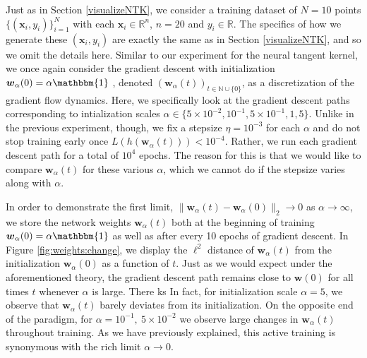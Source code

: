 \documentclass{article}
\begin{document}
Just as in Section \ref{visualizeNTK}, we consider a training dataset of $N = 10$ points $\{(\boldsymbol{x}_i, y_i) \}_{i=1}^N$ with each $\boldsymbol{x}_i \in \mathbb{R}^n$, $n=20$ and $y_i \in \mathbb{R}$. The specifics of how we generate these $(\boldsymbol{x}_i, y_i)$ are exactly the same as in Section \ref{visualizeNTK}, and so we omit the details here. Similar to our experiment for the neural tangent kernel, we once again consider the gradient descent with initialization $\boldsymbol{w}_{\alpha}(0) = \alpha \mathbbm{1}$ , denoted $(\boldsymbol{w}_{\alpha}(t))_{t \in \mathbb{N}\cup\{0\}}$, as a discretization of the gradient flow dynamics. Here, we specifically look at the gradient descent paths corresponding to intialization scales $\alpha \in \{ 5\times10^{-2}, 10^{-1}, 5 \times 10^{-1}, 1, 5\}$. Unlike in the previous experiment, though, we fix a stepsize $\eta = 10^{-3}$ for each $\alpha$ and do not stop training early once $L(h(\boldsymbol{w}_{\alpha}(t))) < 10^{-4}$. Rather, we run each gradient descent path for a total of $10^4$ epochs. The reason for this is that we would like to compare $\boldsymbol{w}_{\alpha}(t)$ for these various $\alpha$, which we cannot do if the stepsize varies along with $\alpha$.

In order to demonstrate the first limit, $\| \boldsymbol{w}_{\alpha}(t) -  \boldsymbol{w}_{\alpha}(0) \|_2 \rightarrow 0$ as $\alpha \rightarrow \infty$, we store the network weights $\boldsymbol{w}_{\alpha}(t)$ both at the beginning of training $\boldsymbol{w}_{\alpha}(0) = \alpha \mathbbm{1}$ as well as after every 10 epochs of gradient descent. In Figure \ref{fig:weights:change}, we display the $\ell^2$ distance of $\boldsymbol{w}_{\alpha}(t)$ from the initialization $\boldsymbol{w}_{\alpha}(0)$ as a function of $t$. Just as we would expect under the aforementioned theory, the gradient descent path remains close to $\boldsymbol{w}(0)$ for all times $t$ whenever $\alpha$ is large. There ks In fact, for initialization scale $\alpha = 5$, we observe that $\boldsymbol{w}_{\alpha}(t)$ barely deviates from its initialization. On the opposite end of the paradigm, for $\alpha = 10^{-1}, \ 5 \times 10^{-2}$ we observe large changes in $\boldsymbol{w}_{\alpha}(t)$ throughout training. As we have previously explained, this active training is synonymous with the rich limit $\alpha \rightarrow 0$.
\end{document}
